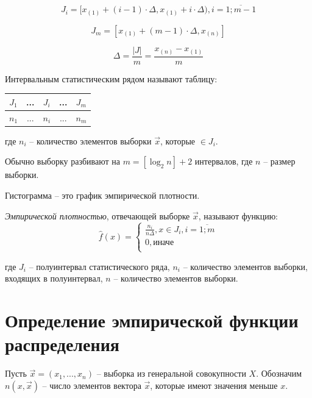 \documentclass[12pt]{report}
\begin{document}
\begin{equation*}
	J_i = [x_{(1)} + (i - 1) \cdot \Delta, x_{(1)} + i \cdot \Delta), i = \overline{1; m - 1}
\end{equation*}

\begin{equation*}
	J_{m} = [x_{(1)} + (m - 1) \cdot \Delta, x_{(n)}]
\end{equation*}

\begin{equation*}
	\Delta = \frac{|J|}{m} = \frac{x_{(n)} - x_{(1)}}{m}
\end{equation*}

Интервальным статистическим рядом называют таблицу:

\begin{table}[htb]
	\centering
	\begin{tabular}{|c|c|c|c|c|}
		\hline
		$J_1$ & ... & $J_i$ & ... & $J_m$ \\
		\hline
		$n_1$ & ... & $n_i$ & ... & $n_m$ \\
		\hline
	\end{tabular}
\end{table}

где $n_i$ -- количество элементов выборки $\vec x$, которые $\in J_i$.

Обычно выборку разбивают на $m=[\log_2n]+2$ интервалов, где $n$ -- размер выборки.

Гистограмма -- это график эмпирической плотности. 

\textit{Эмпирической плотностью}, отвечающей выборке $\vec x$, называют функцию:
\begin{equation}
	\hat f(x) =
	\begin{cases}
		\frac{n_i}{n \Delta}, x \in J_i, i = \overline{1; m} \\
		0, \text{иначе} \\
	\end{cases}
\end{equation}

где $J_i$ -- полуинтервал статистического ряда, $n_i$ -- количество элементов выборки, входящих в полуинтервал, $n$ -- количество элементов выборки.

\section*{Определение эмпирической функции распределения}

Пусть $\vec x = (x_1, ..., x_n)$ -- выборка из генеральной совокупности $X$. Обозначим $n(x, \vec x)$ -- число элементов вектора $\vec x$, которые имеют значения меньше $x$.
\end{document}

